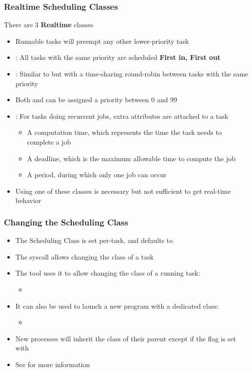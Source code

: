 \begin{frame}
	\frametitle{Realtime Scheduling Classes}
	There are 3 \textbf{Realtime} classes
	\begin{itemize}
		\item Runnable tasks will preempt any other lower-priority task
		\item {}: All tasks with the same priority are scheduled \textbf{First in, First out}
		\item {}: Similar to  but with a time-sharing round-robin between tasks with the same priority
		\item Both  and  can be assigned a priority between 0 and 99
		\item {}: For tasks doing recurrent jobs, extra attributes are attached to a task
			\begin{itemize}
				\item A computation time, which represents the time the task needs to complete a job
				\item A deadline, which is the maximum allowable time to compute the job
				\item A period, during which only one job can occur
			\end{itemize}
		\item Using one of these classes is necessary but not sufficient to get real-time behavior
	\end{itemize}
\end{frame}

\begin{frame}
	\frametitle{Changing the Scheduling Class}
	\begin{itemize}
		\item The Scheduling Class is set per-task, and defaults to 
		\item The  syscall allows changing the class of a task
		\item The  tool uses it to allow changing the class of a running task:
			\begin{itemize}
				\item {}
			\end{itemize}
		\item It can also be used to launch a new program with a dedicated class:
			\begin{itemize}
				\item {}
			\end{itemize}
		\item New processes will inherit the class of their parent except if the  flag is set with 
		\item See  for more information
	\end{itemize}
\end{frame}
